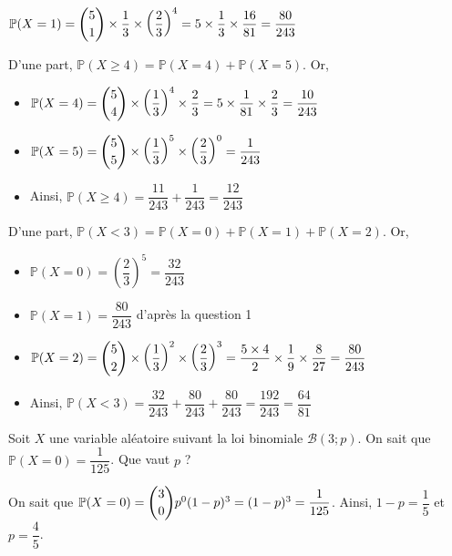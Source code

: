 \documentclass[11pt,fleqn, openany]{book} %
\begin{document}
\begin{solution}$\mathbb{P}(X=1)=\dbinom{5}{1} \times \dfrac{1}{3} \times \left(\dfrac{2}{3}\right)^4=5\times \dfrac{1}{3} \times \dfrac{16}{81}=\dfrac{80}{243}$

D'une part, $\mathbb{P}(X \geqslant 4)=\mathbb{P}(X=4) + \mathbb{P}(X=5)$. Or,
\begin{itemize}
\item $\mathbb{P}(X=4)=\dbinom{5}{4} \times \left(\dfrac{1}{3}\right)^4 \times \dfrac{2}{3}=5 \times \dfrac{1}{81} \times \dfrac{2}{3}=\dfrac{10}{243}$
\item $\mathbb{P}(X=5)=\dbinom{5}{5} \times \left( \dfrac{1}{3}\right)^5 \times \left(\dfrac{2}{3}\right)^0 = \dfrac{1}{243}$
\item Ainsi, $\mathbb{P}(X \geqslant 4)= \dfrac{11}{243}+\dfrac{1}{243}=\dfrac{12}{243}$
\end{itemize}

D'une part, $\mathbb{P}(X<3)=\mathbb{P}(X=0)+\mathbb{P}(X=1)+\mathbb{P}(X=2)$. Or,
\begin{itemize}
\item $\mathbb{P}(X=0)= \left(\dfrac{2}{3}\right)^5=\dfrac{32}{243}$
\item $\mathbb{P}(X=1)= \dfrac{80}{243}$ d'après la question 1
\item $\mathbb{P}(X=2)= \dbinom{5}{2} \times \left( \dfrac{1}{3}\right)^2 \times \left( \dfrac{2}{3} \right)^3 = \dfrac{5 \times 4}{2} \times \dfrac{1}{9} \times \dfrac{8}{27}=\dfrac{80}{243}$
\item Ainsi, $\mathbb{P}(X<3)=\dfrac{32}{243}+\dfrac{80}{243}+\dfrac{80}{243}=\dfrac{192}{243}=\dfrac{64}{81}$
\end{itemize}
\end{solution} 



\begin{exercise}[topic=prob12, subtitle={(Amérique du Nord 2023)}]Soit $X$ une variable aléatoire suivant la loi binomiale $\mathcal{B}(3;p)$. On sait que $\mathbb{P}(X=0)=\dfrac{1}{125}$. Que vaut $p$ ?\end{exercise}

\begin{solution}On sait que $\mathbb{P}(X=0)=\dbinom{3}{0}p^0(1-p)^3=(1-p)^3=\dfrac{1}{125}$. Ainsi, $1-p=\dfrac{1}{5}$ et $p=\dfrac{4}{5}$.\end{solution}
\end{document}
